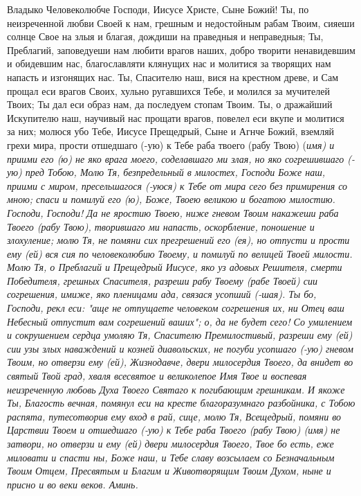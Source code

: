 Владыко Человеколюбче Господи, Иисусе Христе, Сыне Божий! Ты, по неизреченной любви Своей к нам, грешным и недостойным рабам Твоим, сияеши солнце Свое на злыя и благая, дождиши на праведныя и неправедныя; Ты, Преблагий, заповедуеши нам любити врагов наших, добро творити ненавидевшим и обидевшим нас, благославляти клянущих нас и молитися за творящих нам напасть и изгонящих нас. Ты, Спасителю наш, вися на крестном древе, и Сам прощал еси врагов Своих, хульно ругавшихся Тебе, и молился за мучителей Твоих; Ты дал еси образ нам, да последуем стопам Твоим. Ты, о дражайший Искупителю наш, научивый нас прощати врагов, повелел еси вкупе и молитися за них; молюся убо Тебе, Иисусе Прещедрый, Сыне и Агнче Божий, вземляй грехи мира, прости отшедшаго (-ую) к Тебе раба твоего (рабу Твою) (\itshape имя\normalfont{}) и приими его (ю) не яко врага моего, соделавшаго ми злая, но яко согрешившаго (-ую) пред Тобою, Молю Тя, безпредельный в милостех, Господи Боже наш, приими с миром, пресельшагося (-уюся) к Тебе от мира сего без примирения со мною; спаси и помилуй его (ю), Боже, Твоею великою и богатою милостию. Господи, Господи! Да не яростию Твоею, ниже гневом Твоим накажеши раба Твоего (рабу Твою), творившаго ми напасть, оскорбление, поношение и злохуление; молю Тя, не помяни сих прегрешений его (ея), но отпусти и прости ему (ей) вся сия по человеколюбию Твоему, и помилуй по велицей Твоей милости. Молю Тя, о Преблагий и Прещедрый Иисусе, яко уз адовых Решителя, смерти Победителя, грешных Спасителя, разреши рабу Твоему (рабе Твоей) сии согрешения, имиже, яко пленицами ада, связася усопший (-шая). Ты бо, Господи, рекл еси: "аще не отпущаете человеком согрешения их, ни Отец ваш Небесный отпустит вам согрешений ваших"; о, да не будет сего! Со умилением и сокрушением сердца умоляю Тя, Спасителю Премилостивый, разреши ему (ей) сии узы злых наваждений и козней диавольских, не погуби усопшаго (-ую) гневом Твоим, но отверзи ему (ей), Жизнодавче, двери милосердия Твоего, да внидет во святый Твой град, хваля всесвятое и великолепое Имя Твое и воспевая неизреченную любовь Духа Твоего Святаго к погибающим грешникам. И якоже Ты, Благость вечная, помянул еси на кресте благоразумнаго разбойника, с Тобою распята, путесотворив ему вход в рай, сице, молю Тя, Всещедрый, помяни во Царствии Твоем и отшедшаго (-ую) к Тебе раба Твоего (рабу Твою) (\itshape имя\normalfont{}) не затвори, но отверзи и ему (ей) двери милосердия Твоего, Твое бо есть, еже миловати и спасти ны, Боже наш, и Тебе славу возсылаем со Безначальным Твоим Отцем, Пресвятым и Благим и Животворящим Твоим Духом, ныне и присно и во веки веков. Аминь. 


